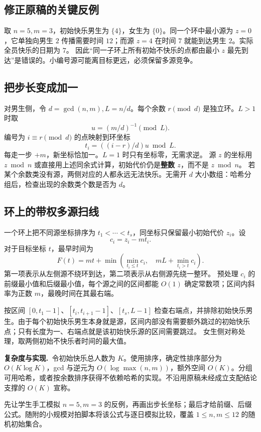 \documentclass[UTF8,a4paper,11pt,oneside,openany,fontset=fandol]{ctexbook}
\theoremstyle{definition}
\newcommand{\cost}{\par\noindent\textbf{复杂度与实现.}\ }
\begin{document}
\subsection{修正原稿的关键反例}
取 $n=5,m=3$，初始快乐男生为 $\{4\}$，女生为 $\{0\}$。同一个环中最小源为 $z=0$，它单独向男生 $2$ 传播需要时间 $12$；而源 $z=4$ 在时间 $7$ 就能到达男生 $2$。实际全员快乐的日期为 $7$。
因此“同一子环上所有初始不快乐的点都由最小 $z$ 最先到达”是错误的。小编号源可能离目标更远，必须保留多源竞争。

\subsection{把步长变成加一}
对男生侧，令 $d=\gcd(n,m),L=n/d$。每个余数 $r\pmod d$ 是独立环。$L>1$ 时取
\[
 u=(m/d)^{-1}\pmod L.
\]
编号为 $i\equiv r\pmod d$ 的点映射到环坐标
\[
 t_i=((i-r)/d)u\bmod L.
\]
每走一步 $+m$，新坐标恰加一。$L=1$ 时只有坐标零，无需求逆。
源 $z$ 的坐标用 $z\bmod n$ 或直接用上述同余式计算，初始代价仍是\textbf{整数 $z$}，而不是 $z\bmod n$。
若某个余数类没有源，两侧对应的人都永远无法快乐。无需开 $d$ 大小数组：哈希分组后，检查出现的余数类个数是否为 $d$。

\subsection{环上的带权多源扫线}
一个环上把不同源坐标排序为 $t_1<\cdots<t_s$，同坐标只保留最小初始代价 $z_i$。设
\[
 c_i=z_i-mt_i.
\]
对于目标坐标 $t$，最早时间为
\[
 F(t)=mt+\min\left(
 \min_{t_i\le t}c_i,\quad
 mL+\min_{t_i>t}c_i\right).
\]
第一项表示从左侧源不绕环到达，第二项表示从右侧源先绕一整环。
预处理 $c_i$ 的前缀最小值和后缀最小值，每个源之间的区间都能 $O(1)$ 确定常数项；区间内斜率为正数 $m$，最晚时间在其最右端。

按区间 $[0,t_1-1]$、$[t_i,t_{i+1}-1]$、$[t_s,L-1]$ 检查右端点，并排除初始快乐男生。由于每个初始快乐男生本身就是源，区间内部没有需要额外跳过的初始快乐点；只有长度为一、右端点就是该初始快乐源的区间需要跳过。
女生侧对称处理，取两侧初始不快乐者时间的最大值。

\cost 令初始快乐总人数为 $K$。使用排序，确定性排序部分为 $O(K\log K)$，gcd 与逆元为 $O(\log\max(n,m))$，额外空间 $O(K)$。分组可用哈希，或者按余数排序获得不依赖哈希的实现。不沿用原稿未经成立支配结论支撑的 $O(K)$ 宣称。
\begin{teach}[备课验证]
先让学生手工模拟 $n=5,m=3$ 的反例，再画出步长坐标；最后才给前缀、后缀公式。随附的小规模对拍脚本将该公式与逐日模拟比较，覆盖 $1\le n,m\le12$ 的随机初始集合。
\end{teach}
\end{document}

